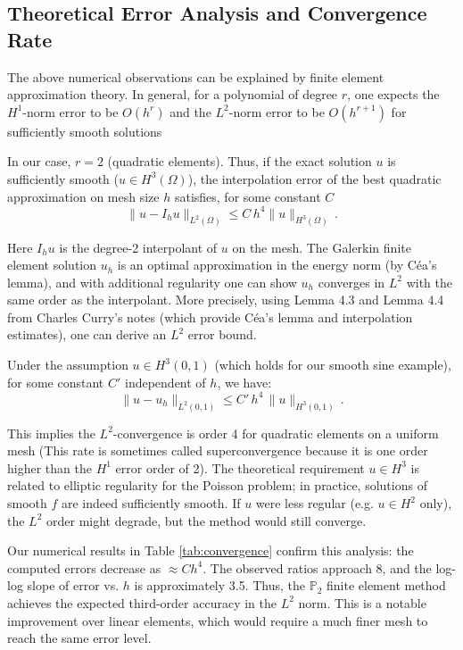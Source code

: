 \subsection{Theoretical Error Analysis and Convergence Rate}
\label{sec:error_analysis}
The above numerical observations can be explained by finite element approximation theory.
In general, for a polynomial of degree \(r\), one expects the \(H^1\)-norm error to be \(O(h^r)\) and the \(L^2\)-norm error to be \(O(h^{r+1})\) for sufficiently smooth solutions

In our case, \(r=2\) (quadratic elements).
Thus, if the exact solution \(u\) is sufficiently smooth (\(u \in H^3(\Omega)\)), the interpolation error of the best quadratic approximation on mesh size \(h\) satisfies, for some constant \(C\)
\[
	\|u - I_h u\|_{L^2(\Omega)} \le C\,h^{4} \|u\|_{H^3(\Omega)}\, .
\]

Here \(I_h u\) is the degree-2 interpolant of \(u\) on the mesh.
The Galerkin finite element solution \(u_h\) is an optimal approximation in the energy norm (by Céa's lemma), and with additional regularity one can show \(u_h\) converges in \(L^2\) with the same order as the interpolant.
More precisely, using Lemma 4.3 and Lemma 4.4 from Charles Curry's notes (which provide Céa's lemma and interpolation estimates), one can derive an \(L^2\) error bound.

Under the assumption \(u \in H^3(0,1)\) (which holds for our smooth sine example), for some constant \(C'\) independent of \(h\), we have:
\[
	\|u - u_h\|_{L^2(0,1)} \le C'\,h^{4}\,\|u\|_{H^3(0,1)}\,.
\]

This implies the \(L^2\)-convergence is order 4 for quadratic elements on a uniform mesh (This rate is sometimes called superconvergence because it is one order higher than the \(H^1\) error order of 2).
The theoretical requirement \(u\in H^3\) is related to elliptic regularity for the Poisson problem; in practice, solutions of smooth \(f\) are indeed sufficiently smooth.
If \(u\) were less regular (e.g. \(u\in H^2\) only), the \(L^2\) order might degrade, but the method would still converge.

Our numerical results in Table \ref{tab:convergence} confirm this analysis:
the computed errors decrease as \(\approx C h^{4}\).
The observed ratios approach 8, and the log-log slope of error vs. \(h\) is approximately 3.5.
Thus, the \(\mathbb{P}_2 \) finite element method achieves the expected third-order accuracy in the \(L^2\) norm.
This is a notable improvement over linear elements, which would require a much finer mesh to reach the same error level.

